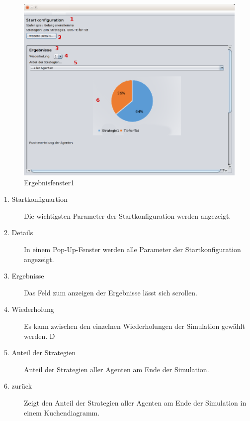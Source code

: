 \begin{figure}[hp] 
  \centering
     \includegraphics[width=1.1\textwidth]{GUI_Entwurf/Ergebnisfenster1.png}
  \caption{Ergebnisfenster1}
  \label{fig:Bild7}
\end{figure}

\begin{description}

\item[1. Startkonfiguartion] Die wichtigsten Parameter der Startkonfiguration werden angezeigt.

\item[2. Details] In einem Pop-Up-Fenster werden alle Parameter der Startkonfiguration angezeigt.

\item[3. Ergebnisse] Das Feld zum anzeigen der Ergebnisse lässt sich scrollen.

\item[4. Wiederholung] Es kann zwischen den einzelnen Wiederholungen der Simulation gewählt werden. D

\item[5. Anteil der Strategien] Anteil der Strategien aller Agenten am Ende der Simulation. 

\item[6. zurück] Zeigt den Anteil der Strategien aller Agenten am Ende der Simulation in einem Kuchendiagramm. 

\end{description}

\pagebreak

